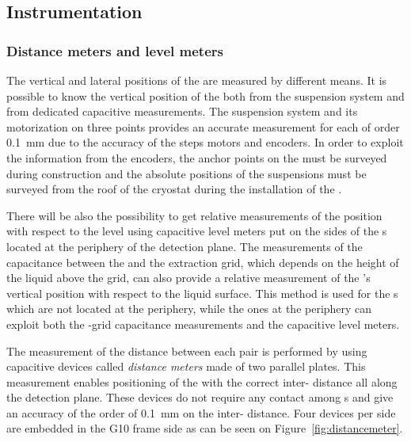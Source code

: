 \subsection{Instrumentation}
\label{sec:fddp-crp-instr}

\subsubsection{Distance meters and level meters}

The vertical and lateral positions of the  are measured by different means. 
It is possible to know the vertical position of the  both from the suspension system and from dedicated capacitive measurements.
The  suspension system and its motorization on three points provides an accurate measurement for each  of order \SI{0.1}{mm} due to the accuracy of the steps motors and encoders. 
In order to exploit the information from the encoders,  the anchor points on the  must be surveyed during construction and the absolute positions of the suspensions must be surveyed from the roof of the cryostat during the installation of the \fdth.

There will be also the possibility to get relative measurements of the  position with respect to the \lar level using capacitive level meters put on the sides of the s located at the periphery of the detection plane.  The  measurements of the capacitance between the  and the extraction grid, which depends on the height of the liquid above the grid, can also provide a relative measurement  of the 's vertical position with respect to the liquid surface. This method is used for the s which are not located at the periphery, while the ones at the periphery can exploit both the  -grid capacitance measurements and the capacitive level meters.
 
 
The measurement of the distance between each  pair is performed by using capacitive devices called \textit{distance meters} made of two parallel plates. %
This measurement enables positioning of the  with the correct  inter- distance all along the detection plane. These devices do not require any contact among  s and give an accuracy of the order of \SI{0.1}{mm} on the  inter- distance.  Four devices per  side are embedded in the G10 frame side as can be seen on Figure~\ref{fig:distancemeter}.

